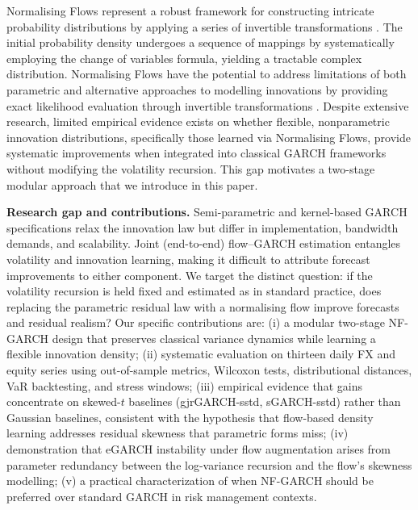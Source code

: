 \documentclass[risks,article,submit,pdftex,moreauthors]{Definitions/mdpi}
\begin{document}
Normalising Flows represent a robust framework for constructing intricate probability distributions by applying a series of invertible transformations \citep{rezende2015variational, mongwe2025bayesian}. The initial probability density undergoes a sequence of mappings by systematically employing the change of variables formula, yielding a tractable complex distribution. Normalising Flows have the potential to address limitations of both parametric and alternative approaches to modelling innovations by providing exact likelihood evaluation through invertible transformations \citep{rezende2015variational, papamakarios2021normalising, seitz2022garchnf}. Despite extensive research, limited empirical evidence exists on whether flexible, nonparametric innovation distributions, specifically those learned via Normalising Flows, provide systematic improvements when integrated into classical GARCH frameworks without modifying the volatility recursion. This gap motivates a two-stage modular approach that we introduce in this paper.

\textbf{Research gap and contributions.} Semi-parametric and kernel-based GARCH specifications \citep{engle1993measuring, hansen2004nonparametric} relax the innovation law but differ in implementation, bandwidth demands, and scalability. Joint (end-to-end) flow--GARCH estimation \citep{seitz2022garchnf} entangles volatility and innovation learning, making it difficult to attribute forecast improvements to either component. We target the distinct question: if the volatility recursion is held fixed and estimated as in standard practice, does replacing the parametric residual law with a normalising flow improve forecasts and residual realism? Our specific contributions are: (i) a modular two-stage NF-GARCH design that preserves classical variance dynamics while learning a flexible innovation density; (ii) systematic evaluation on thirteen daily FX and equity series using out-of-sample metrics, Wilcoxon tests, distributional distances, VaR backtesting, and stress windows; (iii) empirical evidence that gains concentrate on skewed-$t$ baselines (gjrGARCH-sstd, sGARCH-sstd) rather than Gaussian baselines, consistent with the hypothesis that flow-based density learning addresses residual skewness that parametric forms miss; (iv) demonstration that eGARCH instability under flow augmentation arises from parameter redundancy between the log-variance recursion and the flow's skewness modelling; (v) a practical characterization of when NF-GARCH should be preferred over standard GARCH in risk management contexts.
\end{document}
